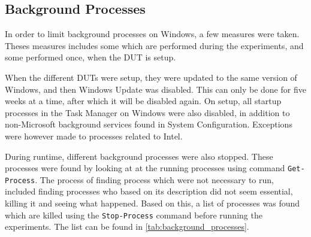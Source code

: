 \subsection{Background Processes}

In order to limit background processes on Windows, a few measures were taken. Theses measures includes some which are performed during the experiments, and some performed once, when the DUT is setup.

When the different DUTs were setup, they were updated to the same version of Windows, and then Windows Update was disabled. This can only be done for five weeks at a time, after which it will be disabled again. On setup, all startup processes in the Task Manager on Windows were also disabled, in addition to non-Microsoft background services found in System Configuration. Exceptions were however made to processes related to Intel.



During runtime, different background processes were also stopped. These processes were found by looking at at the running processes using command \texttt{Get-Process}. The process of finding process which were not necessary to run, included finding processes who based on its description did not seem essential, killing it and seeing what happened. Based on this, a list of processes was found which are killed using the \texttt{Stop-Process} command before running the experiments. The list can be found in \cref{tab:background_processes}.